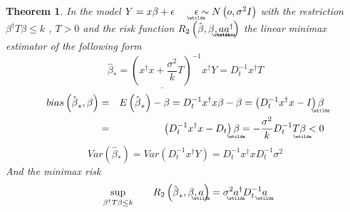 \documentclass{article}
\newtheorem{theorem}{Theorem}
\begin{document}
\begin{theorem}
In the model $Y=x\beta +\epsilon \qquad 
\underaccent{\wtilde}{\epsilon}%
\sim N\left( o,\sigma ^{2}I\right) $ with the restriction $\beta ^{\dagger
}T\beta \leq k$ , $T>0$ and the risk function $R_{2}\left( \hat{\beta},\beta
,%
\underaccent{\wtilde}{a}%
\underaccent{\wtilde}{a}%
^{\dagger }\right) $ the linear minimax estimator of the following form%
\begin{equation*}
\underline{\hat{\beta}_{\ast }=\left( x^{\dagger }x+\frac{\sigma ^{2}}{k}%
T\right) ^{-1}x^{\dagger }Y}=D_{t}^{-1}x^{\dagger }T
\end{equation*}%
\begin{eqnarray*}
bias\left( \hat{\beta}_{\ast },\beta \right) &=&E\left( \hat{\beta}_{\ast
}\right) -\beta =D_{t}^{-1}x^{\dagger }x\beta -\beta =\left(
D_{t}^{-1}x^{\dagger }x-I\right) 
\underaccent{\wtilde}{\beta}
\\
&=&\left( D_{t}^{-1}x^{\dagger }x-D_{t}\right) 
\underaccent{\wtilde}{\beta}%
=-\frac{\sigma ^{2}}{k}D_{t}^{-1}T%
\underaccent{\wtilde}{\beta}%
<0
\end{eqnarray*}%
\begin{equation*}
Var\left( \hat{\beta}_{\ast }\right) =Var\left( D_{t}^{-1}x^{\dagger
}Y\right) =D_{t}^{-1}x^{\dagger }xD_{t}^{-1}\sigma ^{2}
\end{equation*}%
And the minimax risk%
\begin{equation*}
\underset{\beta ^{\dagger }T\beta \leq k}{\sup }\qquad R_{2}\left( \hat{\beta%
}_{\ast },\beta ,%
\underaccent{\wtilde}{a}%
\right) =\sigma ^{2}%
\underaccent{\wtilde}{a}%
^{\dagger }D_{t}^{-1}%
\underaccent{\wtilde}{a}%
\end{equation*}
\end{theorem}
\end{document}
